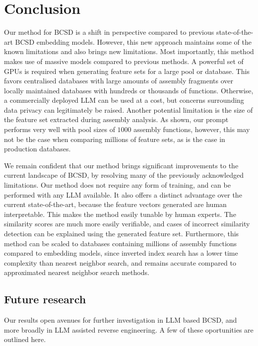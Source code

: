 \section{Conclusion}
\label{sec:conclusion}

Our method for BCSD is a shift in perspective compared to previous state-of-the-art BCSD embedding models. However,
this new approach maintains some of the known limitations and also brings new limitations. Most importantly, this
method makes use of massive models compared to previous methods. A powerful set of GPUs is required when generating
feature sets for a large pool or database. This favors centralised databases with large amounts of assembly fragments over
locally maintained databases with hundreds or thousands of functions. Otherwise, a commercially deployed LLM can be used at a
cost, but concerns surrounding data privacy can legitimately be raised. Another potential limitation is the size of the feature
set extracted during assembly analysis. As shown, our prompt performs very well with pool sizes of \(1000\) assembly functions,
however, this may not be the case when comparing millions of feature sets, as is the case in production databases.

We remain confident that our method brings significant improvements to the current landscape of BCSD, by resolving
many of the previously acknowledged limitations. Our method does not require any form of training, and can be performed with any LLM
available. It also offers a distinct advantage over the current state-of-the-art, because the feature vectors generated are human
interpretable. This makes the method easily tunable by human experts. The similarity scores are much more easily verifiable, and
cases of incorrect similarity detection can be explained using the generated feature set. Furthermore, this method can be scaled to
databases containing millions of assembly functions compared to embedding models, since inverted index search has a lower time
complexity than nearest neighbor search, and remains accurate compared to approximated nearest neighbor search methods.

\subsection{Future research}

Our results open avenues for further investigation in LLM based BCSD, and more broadly in LLM assisted reverse engineering.
A few of these oportunities are outlined here.

